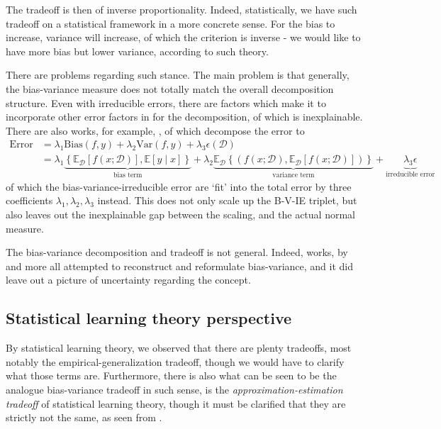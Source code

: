 \documentclass[10pt,oneside,oldfontcommands,dvipsnames,article]{memoir}
\begin{document}
The tradeoff is then of inverse proportionality. Indeed, statistically, we have such tradeoff on a statistical framework in a more concrete sense. For the bias to increase, variance will increase, of which the criterion is inverse - we would like to have more bias but lower variance, according to such theory. 

There are problems regarding such stance. The main problem is that generally, the bias-variance measure does not totally match the overall decomposition structure. Even with irreducible errors, there are factors which make it to incorporate other error factors in for the decomposition, of which is inexplainable. There are also works, for example, \cite{domingos_unifeid_2000}, of which decompose the error to 
\begin{equation*}
        \begin{split}
            \mathrm{Error} & = \lambda_{1} \mathrm{Bias}(f,y) + \lambda_{2}\mathrm{Var}(f,y)+ \lambda_{3}\epsilon(\mathcal{D})\\ 
            & = \lambda_{1}\underbrace{\left\{ \mathbb{E}_{\mathcal{D}}[f(x;\mathcal{D})] , \mathbb{E}[y\mid x] \right\}}_{\text{bias term}} +\lambda_{2} \underbrace{\mathbb{E}_{\mathcal{D}} \left\{(f(x;\mathcal{D}), \mathbb{E}_{\mathcal{D}}[f(x;\mathcal{D})])\right\}}_{\text{variance term}} +\underbrace{\lambda_{3}\epsilon}_{\text{irreducible error}}
        \end{split}
\end{equation*}
of which the bias-variance-irreducible error are `fit' into the total error by three coefficients $\lambda_{1},\lambda_{2},\lambda_{3}$ instead. This does not only scale up the B-V-IE triplet, but also leaves out the inexplainable gap between the scaling, and the actual normal measure. 

The bias-variance decomposition and tradeoff is not general. Indeed, works, by \cite{6797087,sharma_bias-variance_2014,domingos_unifeid_2000,adlam2020understandingdoubledescentrequires,yang_rethinking_2020} and more all attempted to reconstruct and reformulate bias-variance, and it did leave out a picture of uncertainty regarding the concept. 

\subsection{Statistical learning theory perspective}
By statistical learning theory, we observed that there are plenty tradeoffs, most notably the empirical-generalization tradeoff, though we would have to clarify what those terms are. Furthermore, there is also what can be seen to be the analogue bias-variance tradeoff in such sense, is the \textit{approximation-estimation tradeoff} of statistical learning theory, though it must be clarified that they are strictly not the same, as seen from \cite{brown2024biasvariance}. 
\end{document}
